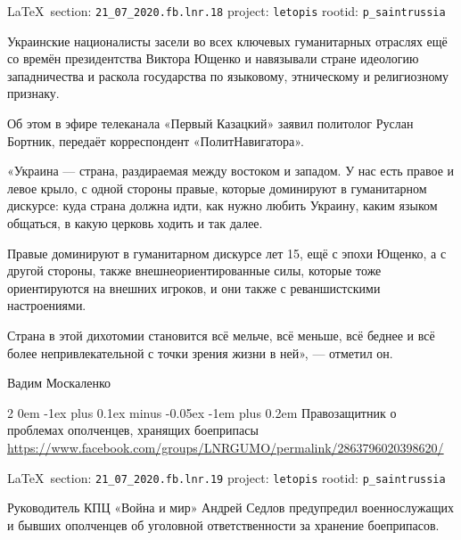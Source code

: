 \documentclass[a4paper,11pt]{extreport}
\makeatletter
\renewcommand\subsection{%
  \clearpage
    \@startsection{subsection}%
    {2}%
    {0em}%
    {-1ex plus 0.1ex minus -0.05ex}%
    {-1em plus 0.2em}%
    {\scshape\bfseries\Large}%
}
\makeatother
\begin{document}
\vspace{0.5cm}
{\small\LaTeX~section: \verb|21_07_2020.fb.lnr.18| project: \verb|letopis| rootid: \verb|p_saintrussia|}
\vspace{0.5cm}

Украинские националисты засели во всех ключевых гуманитарных отраслях ещё со
времён президентства Виктора Ющенко и навязывали стране идеологию западничества
и раскола государства по языковому, этническому и религиозному признаку.

Об этом в эфире телеканала «Первый Казацкий» заявил политолог Руслан Бортник,
передаёт корреспондент «ПолитНавигатора».

«Украина --- страна, раздираемая между востоком и западом. У нас есть правое и
левое крыло, с одной стороны правые, которые доминируют в гуманитарном
дискурсе: куда страна должна идти, как нужно любить Украину, каким языком
общаться, в какую церковь ходить и так далее.

Правые доминируют в гуманитарном дискурсе лет 15, ещё с эпохи Ющенко, а с
другой стороны, также внешнеориентированные силы, которые тоже ориентируются на
внешних игроков, и они также с реваншистскими настроениями.

Страна в этой дихотомии становится всё мельче, всё меньше, всё беднее и всё
более непривлекательной с точки зрения жизни в ней», --- отметил он.

Вадим Москаленко
 
 
  
\subsection{Правозащитник о проблемах ополченцев, хранящих боеприпасы}
\label{sec:21_07_2020.fb.lnr.19}
\url{https://www.facebook.com/groups/LNRGUMO/permalink/2863796020398620/}

\vspace{0.5cm}
{\small\LaTeX~section: \verb|21_07_2020.fb.lnr.19| project: \verb|letopis| rootid: \verb|p_saintrussia|}
\vspace{0.5cm}

Руководитель КПЦ «Война и мир» Андрей Седлов предупредил военнослужащих и
бывших ополченцев об уголовной ответственности за хранение боеприпасов.
\end{document}
